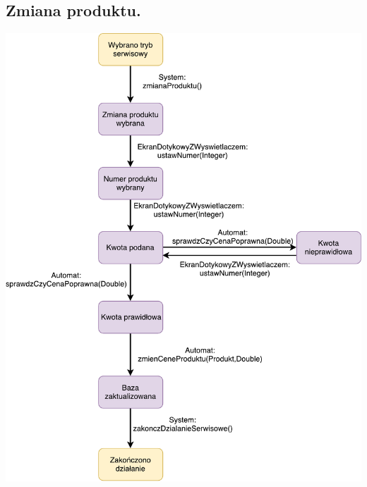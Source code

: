 \documentclass[11pt]{article}
\begin{document}
		\subsection{Zmiana produktu.}
		\begin{center}
			\includegraphics[scale=0.85]{stanu6.pdf}
		\end{center}
\end{document}
